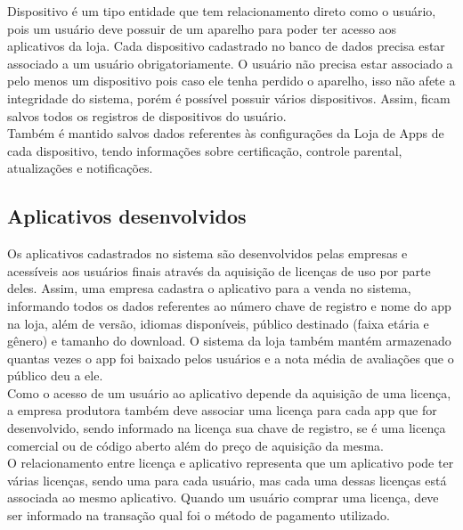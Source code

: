 Dispositivo é um tipo entidade que tem relacionamento direto como o usuário, pois um usuário deve possuir de um aparelho para poder ter acesso aos aplicativos da loja. Cada dispositivo cadastrado no banco de dados precisa estar associado a um usuário obrigatoriamente. O usuário não precisa estar associado a pelo menos um dispositivo pois caso ele tenha perdido o aparelho, isso não afete a integridade do sistema, porém é possível possuir vários dispositivos. Assim, ficam salvos todos os registros de dispositivos do usuário.\\

Também é mantido salvos dados referentes às configurações da Loja de Apps de cada dispositivo, tendo informações sobre certificação, controle parental, atualizações e notificações.\\



\subsection{Aplicativos desenvolvidos}


Os aplicativos cadastrados no sistema são desenvolvidos pelas empresas e acessíveis aos usuários finais através da aquisição de licenças de uso por parte deles. Assim, uma empresa cadastra o aplicativo para a venda no sistema, informando todos os dados referentes ao número chave de registro e nome do app na loja, além de versão, idiomas disponíveis, público destinado (faixa etária e gênero) e tamanho do download. O sistema da loja também mantém armazenado quantas vezes o app foi baixado pelos usuários e a nota média de avaliações que o público deu a ele.\\

Como o acesso de um usuário ao aplicativo depende da aquisição de uma licença, a empresa produtora também deve associar uma licença para cada app que for desenvolvido, sendo informado na licença sua chave de registro, se é uma licença comercial ou de código aberto além do preço de aquisição da mesma. \\

O relacionamento entre licença e aplicativo representa que um aplicativo pode ter várias licenças, sendo uma para cada usuário, mas cada uma dessas licenças está associada ao mesmo aplicativo. Quando um usuário comprar uma licença, deve ser informado na transação qual foi o método de pagamento utilizado.\\



\endgroup